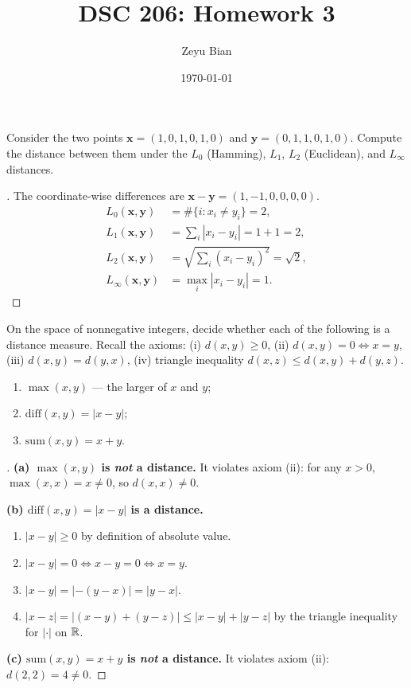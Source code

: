 \documentclass[en,hazy,blue,12pt,normal]{../../elegantnote}
\title{DSC 206: Homework 3}
\author{Zeyu Bian}
\date{\today}
\begin{document}
\maketitle

\begin{homework}
Consider the two points $\bm x=(1,0,1,0,1,0)$ and $\bm y=(0,1,1,0,1,0)$. Compute the distance between them under the $L_0$ (Hamming), $L_1$, $L_2$ (Euclidean), and $L_\infty$ distances.
\end{homework}

\begin{proof}[\solutionname]
The coordinate-wise differences are $\bm x-\bm y=(1,-1,0,0,0,0)$.
\begin{align*}
L_0(\bm x,\bm y) &= \#\{i:x_i\neq y_i\}=2,\\
L_1(\bm x,\bm y) &= \sum_i |x_i-y_i| = 1+1=2,\\
L_2(\bm x,\bm y) &= \sqrt{\sum_i (x_i-y_i)^2}=\sqrt{2},\\
L_\infty(\bm x,\bm y) &= \max_i|x_i-y_i|=1.
\end{align*}
\end{proof}

\begin{homework}
On the space of nonnegative integers, decide whether each of the following is a distance measure. Recall the axioms: (i) $d(x,y)\ge 0$, (ii) $d(x,y)=0 \iff x=y$, (iii) $d(x,y)=d(y,x)$, (iv) triangle inequality $d(x,z)\le d(x,y)+d(y,z)$.
\begin{enumerate}
    \item[(a)] $\max(x,y)$ — the larger of $x$ and $y$;
    \item[(b)] $\mathrm{diff}(x,y)=|x-y|$;
    \item[(c)] $\mathrm{sum}(x,y)=x+y$.
\end{enumerate}
\end{homework}

\begin{proof}[\solutionname]

\textbf{(a) $\max(x,y)$ is \emph{not} a distance.}
It violates axiom (ii): for any $x>0$, $\max(x,x)=x\neq 0$, so $d(x,x)\neq 0$.

\textbf{(b) $\mathrm{diff}(x,y)=|x-y|$ is a distance.}
\begin{enumerate}
    \item[(i)] $|x-y|\ge 0$ by definition of absolute value.
    \item[(ii)] $|x-y|=0 \iff x-y=0 \iff x=y$.
    \item[(iii)] $|x-y|=|-(y-x)|=|y-x|$.
    \item[(iv)] $|x-z|=|(x-y)+(y-z)|\le |x-y|+|y-z|$ by the triangle inequality for $|\cdot|$ on $\mathbb R$.
\end{enumerate}

\textbf{(c) $\mathrm{sum}(x,y)=x+y$ is \emph{not} a distance.}
It violates axiom (ii): $d(2,2)=4\neq 0$.
\end{proof}
\end{document}
